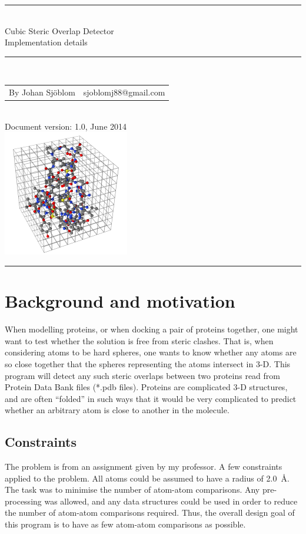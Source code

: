 \documentclass[a4paper]{article}
\newcommand{\progname}{Cubic Steric Overlap Detector}
\newcommand{\doctitle}{Implementation details}
\newcommand{\horrule}[1]{\rule{\linewidth}{#1}} %
\begin{document}
\thispagestyle{plain} %


\begin{center}
\horrule{0.5pt} \\[0.3cm] %
%
\huge  \progname \\[1mm]
\Large \doctitle
\normalsize %

\horrule{2pt} \\[0.1cm] %

\begin{tabular}{ l r }
  By Johan Sjöblom & sjoblomj88@gmail.com
\end{tabular}\\[0.1cm]
\footnotesize Document version: 1.0, June 2014\\[0.4cm]

\includegraphics{res/molspace.png}
\end{center}
\horrule{0.5pt} %
\normalsize %



\section*{Background and motivation}
When modelling proteins, or when docking a pair of proteins together, one might want to test whether the solution is free from steric clashes. That is, when considering atoms to be hard spheres, one wants to know whether any atoms are so close together that the spheres representing the atoms intersect in 3-D. This program will detect any such steric overlaps between two proteins read from Protein Data Bank files (*.pdb files). Proteins are complicated 3-D structures, and are often ``folded'' in such ways that it would be very complicated to predict whether an arbitrary atom is close to another in the molecule.

\subsection*{Constraints}
The problem is from an assignment given by my professor. A few constraints applied to the problem. All atoms could be assumed to have a radius of \mbox{2.0 Å}. The task was to minimise the number of atom-atom comparisons. Any pre-processing was allowed, and any data structures could be used in order to reduce the number of atom-atom comparisons required. Thus, the overall design goal of this program is to have as few atom-atom comparisons as possible.
\end{document}
